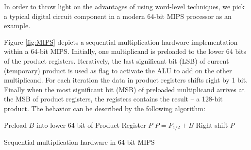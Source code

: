 In order to throw light on the advantages of using word-level techniques, we pick a typical 
digital circuit component in a modern 64-bit MIPS processor as an example.

\begin{Example}
Figure \ref{fig:MIPS} depicts a sequential multiplication hardware implementation within a 64-bit 
MIPS. Initially, one multiplicand is preloaded to the lower 64 bits of the product registers. 
Iteratively, the last significant bit (LSB) of current (temporary) product is used as flag to activate the ALU 
to add on the other multiplicand. For each iteration the data in product registers shifts right by 1 bit.
Finally when the most significant bit (MSB) of preloaded multiplicand arrives at the MSB of product registers,
the registers contains the result -- a 128-bit product. The behavior can be described by the following algorithm:


\begin{algorithm}[H]
\SetAlgoNoLine
\LinesNumbered

  Preload $B$ into lower 64-bit of Product Register $P$\;
  {
  	{
		$P = P_{1/2}+B$\;
	}
	Right shift $P$\;
  }
\caption {Sequential multiplication hardware in 64-bit MIPS}\label{alg:MIPS}
\end{algorithm}

\begin{figure}[tbp]
\end{figure}


\end{Example}
